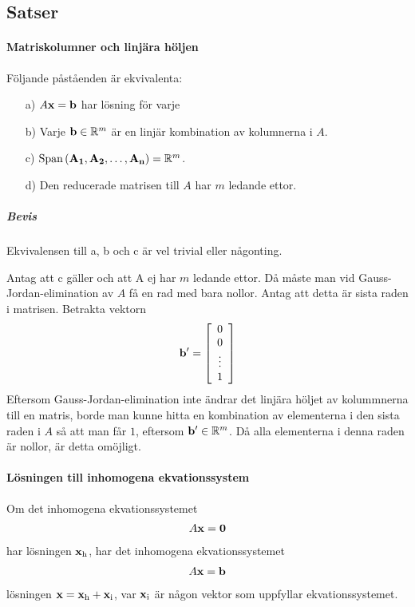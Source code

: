 \subsection{Satser}

\paragraph{Matriskolumner och linjära höljen}
Följande påståenden är ekvivalenta:
\begin{itemize}
	\item[a)] $A\vectorbold{x} = \vect{b}$ har lösning för varje
	\item[b)] Varje $\vect{b}\in \R^{m}$ är en linjär kombination av kolumnerna i $A$.
	\item[c)] $\Span{\vect{A_1}, \vect{A_2}, \dots, \vect{A_n}} = \R^m$.
	\item[d)] Den reducerade matrisen till $A$ har $m$ ledande ettor.
\end{itemize}

\subparagraph{Bevis}
Ekvivalensen till a, b och c är vel trivial eller någonting.

Antag att c gäller och att A ej har $m$ ledande ettor. Då måste man vid Gauss-Jordan-elimination av $A$ få en rad med bara nollor. Antag att detta är sista raden i matrisen. Betrakta vektorn
\begin{align*}
	\vect{b}' =
	\left[\begin{array}{c}
    	0    \\
    	0    \\
    	\vdots \\
	    1
	\end{array}\right]
\end{align*}
Eftersom Gauss-Jordan-elimination inte ändrar det linjära höljet av kolummnerna till en matris, borde man kunne hitta en kombination av elementerna i den sista raden i $A$ så att man får $1$, eftersom $\vect{b}'\in\R^m$. Då alla elementerna i denna raden är nollor, är detta omöjligt.

\paragraph{Lösningen till inhomogena ekvationssystem}
Om det inhomogena ekvationssystemet
\begin{align*}
	A\vect{x} = \vect{0}
\end{align*}
har lösningen $\vect{x}_\text{h}$, har det inhomogena ekvationssystemet
\begin{align*}
	A\vect{x} = \vect{b}
\end{align*}
lösningen $\vect{x} = \vect{x}_\text{h} + \vect{x}_\text{i}$, var $\vect{x}_\text{i}$ är någon vektor som uppfyllar ekvationssystemet.


